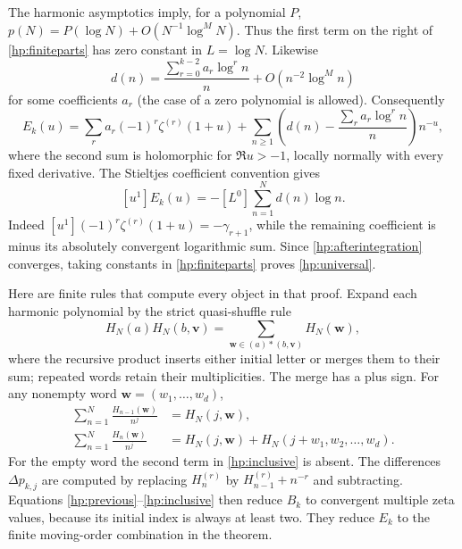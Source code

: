 The harmonic asymptotics imply, for a polynomial $P$,
$p(N)=P(\log N)+O(N^{-1}\log^M N)$. Thus the first term on the
right of \eqref{hp:finiteparts} has zero constant in $L=\log N$.
Likewise
\begin{equation}\label{hp:Dasym}
 d(n)=\frac{\sum_{r=0}^{k-2}a_r\log^r n}{n}
            +O(n^{-2}\log^M n)
\end{equation}
for some coefficients $a_r$ (the case of a zero polynomial is allowed).
Consequently
\[
 E_k(u)=\sum_ra_r(-1)^r\zeta^{(r)}(1+u)
   +\sum_{n\ge1}\left(d(n)-\frac{\sum_ra_r\log^r n}{n}\right)n^{-u},
\]
where the second sum is holomorphic for $\Re u>-1$, locally normally
with every fixed derivative. The Stieltjes coefficient convention gives
\begin{equation}\label{hp:coefficientconstant}
 [u^1]E_k(u)=-[L^0]\sum_{n=1}^Nd(n)\log n.
\end{equation}
Indeed $[u^1](-1)^r\zeta^{(r)}(1+u)=-\gamma_{r+1}$, while the
remaining coefficient is minus its absolutely convergent logarithmic
sum. Since \eqref{hp:afterintegration} converges, taking constants in
\eqref{hp:finiteparts} proves \eqref{hp:universal}.

Here are finite rules that compute every object in that proof. Expand
each harmonic polynomial by the strict quasi-shuffle rule
\begin{equation}\label{hp:stuffle}
 H_N(a)H_N(b,\mathbf v)
   =\sum_{\mathbf w\in(a)*(b,\mathbf v)}H_N(\mathbf w),
\end{equation}
where the recursive product inserts either initial letter or merges
them to their sum; repeated words retain their multiplicities. The
merge has a plus sign. For any nonempty word $\mathbf w=(w_1,\ldots,w_d)$,
\begin{align}
 \sum_{n=1}^N\frac{H_{n-1}(\mathbf w)}{n^j}
     &=H_N(j,\mathbf w),\label{hp:previous}\\
 \sum_{n=1}^N\frac{H_n(\mathbf w)}{n^j}
     &=H_N(j,\mathbf w)+H_N(j+w_1,w_2,\ldots,w_d).
       \label{hp:inclusive}
\end{align}
For the empty word the second term in \eqref{hp:inclusive} is absent.
The differences $\Delta p_{k,j}$ are computed by replacing
$H_n^{(r)}$ by $H_{n-1}^{(r)}+n^{-r}$ and subtracting.
Equations \eqref{hp:previous}--\eqref{hp:inclusive} then reduce $B_k$
to convergent multiple zeta values, because its initial index is
always at least two. They reduce $E_k$ to the finite moving-order
combination in the theorem.

